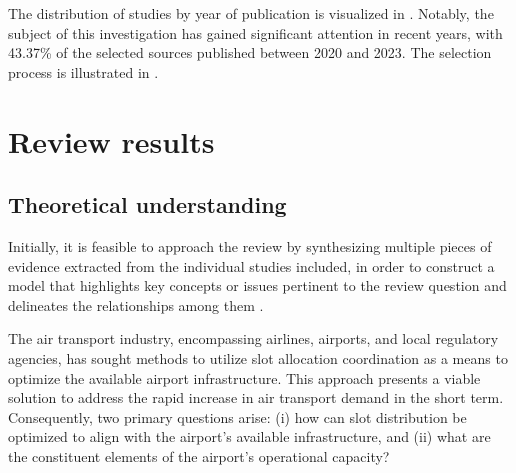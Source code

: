 



The distribution of studies by year of publication is visualized in
.
%
Notably, the subject of this investigation has gained significant attention in
recent years, with 43.37\% of the selected sources published between 2020 and
2023.
%
The selection process is illustrated in .



%

%





\section{Review results}
\label{sec:Review_results}


\subsection{Theoretical understanding}


Initially, it is feasible to approach the review by synthesizing multiple pieces
of evidence extracted from the individual studies included, in order to
construct a model that highlights key concepts or issues pertinent to the review
question and delineates the relationships among them \cite{popay2006guidance}.



The air transport industry, encompassing airlines, airports, and local
regulatory agencies, has sought methods to utilize slot allocation coordination
as a means to optimize the available airport infrastructure.
%
This approach presents a viable solution to address the rapid increase in air
transport demand in the short term.
%
Consequently, two primary questions arise: (i) how can slot distribution be
optimized to align with the airport's available infrastructure, and (ii) what
are the constituent elements of the airport's operational capacity?





